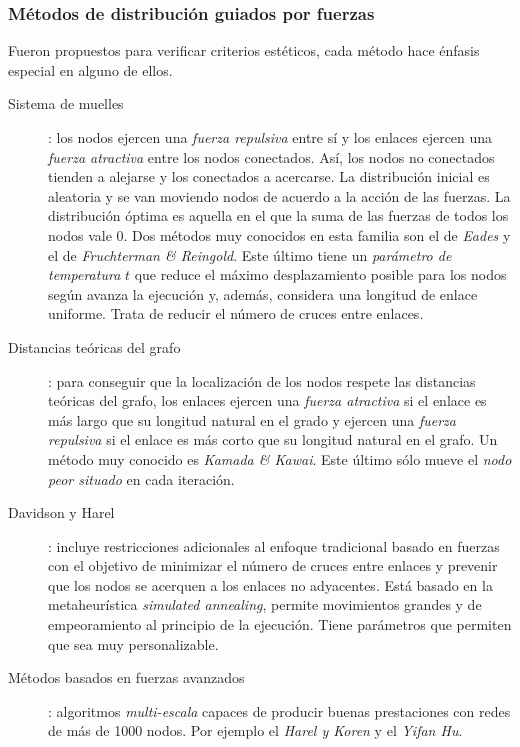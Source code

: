 \documentclass[10pt,spanish, landscape, twocolumn]{article}
\begin{document}
\subsubsection{\textcolor{temacuatro}Métodos de distribución guiados por fuerzas}
Fueron propuestos para verificar criterios estéticos, cada método hace énfasis especial en alguno de ellos.

\begin{description}
    \item[Sistema de muelles]: los nodos ejercen una \textit{\textcolor{temacuatro}{fuerza repulsiva}} entre sí y los enlaces ejercen una \textit{\textcolor{temacuatro}{fuerza atractiva}} entre los nodos conectados. Así, los nodos no conectados tienden a alejarse y los conectados a acercarse. La distribución inicial es aleatoria y se van moviendo nodos de acuerdo a la acción de las fuerzas. La distribución óptima es aquella en el que la suma de las fuerzas de todos los nodos vale 0. Dos métodos muy conocidos en esta familia son el de \textit{\textcolor{temacuatro}{Eades}} y el de \textcolor{temacuatro}{\textit{Fruchterman \& Reingold}}. Este último tiene un \textit{\textcolor{temacuatro}{parámetro de temperatura}} $t$ que reduce el máximo desplazamiento posible para los nodos según avanza la ejecución y, además, considera una longitud de enlace uniforme. Trata de reducir el número de cruces entre enlaces.
    \item[Distancias teóricas del grafo]: para conseguir que la localización de los nodos respete las distancias teóricas del grafo, los enlaces ejercen una \textit{\textcolor{temacuatro}{fuerza atractiva}} si el enlace es más largo que su longitud natural en el grado y ejercen una \textit{\textcolor{temacuatro}{fuerza repulsiva}} si el enlace es más corto que su longitud natural en el grafo. Un método muy conocido es \textit{\textcolor{temacuatro}{Kamada \& Kawai}}. Este último sólo mueve el \textit{\textcolor{temacuatro}{nodo peor situado}} en cada iteración.
    \item[Davidson y Harel]: incluye restricciones adicionales al enfoque tradicional basado en fuerzas con el objetivo de minimizar el número de cruces entre enlaces y prevenir que los nodos se acerquen a los enlaces no adyacentes. Está basado en la metaheurística \textit{\textcolor{temacuatro}{simulated annealing}}, permite movimientos grandes y de empeoramiento al principio de la ejecución. Tiene parámetros que permiten que sea muy personalizable.
    \item[Métodos basados en fuerzas avanzados]: algoritmos \textit{\textcolor{temacuatro}{multi-escala}} capaces de producir buenas prestaciones con redes de más de 1000 nodos. Por ejemplo el \textit{\textcolor{temacuatro}{Harel y Koren}} y el \textit{\textcolor{temacuatro}{Yifan Hu}}.
\end{description}
\end{document}
